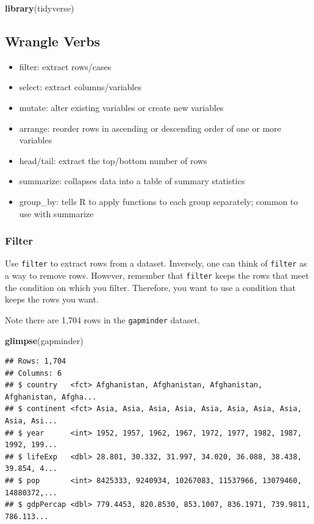 \documentclass[
]{book}
\newenvironment{Shaded}{\begin{snugshade}}{\end{snugshade}}
\newcommand{\KeywordTok}[1]{\textcolor[rgb]{0.13,0.29,0.53}{\textbf{#1}}}
\newcommand{\NormalTok}[1]{#1}
\providecommand{\tightlist}{%
  \setlength{\itemsep}{0pt}\setlength{\parskip}{0pt}}
\begin{document}
\begin{Shaded}
\begin{Highlighting}[]
\KeywordTok{library}\NormalTok{(tidyverse)}
\end{Highlighting}
\end{Shaded}

\hypertarget{wrangle-verbs}{%
\subsection{Wrangle Verbs}\label{wrangle-verbs}}

\begin{itemize}
\tightlist
\item
  filter: extract rows/cases
\item
  select: extract columns/variables
\item
  mutate: alter existing variables or create new variables
\item
  arrange: reorder rows in ascending or descending order of one or more variables
\item
  head/tail: extract the top/bottom number of rows
\item
  summarize: collapses data into a table of summary statistics
\item
  group\_by: tells R to apply functions to each group separately; common to use with summarize
\end{itemize}

\hypertarget{filter}{%
\subsubsection*{Filter}\label{filter}}

Use \texttt{filter} to extract rows from a dataset. Inversely, one can think of \texttt{filter} as a way to remove rows. However, remember that \texttt{filter} keeps the rows that meet the condition on which you filter. Therefore, you want to use a condition that keeps the rows you want.

Note there are 1,704 rows in the \texttt{gapminder} dataset.

\begin{Shaded}
\begin{Highlighting}[]
\KeywordTok{glimpse}\NormalTok{(gapminder)}
\end{Highlighting}
\end{Shaded}

\begin{verbatim}
## Rows: 1,704
## Columns: 6
## $ country   <fct> Afghanistan, Afghanistan, Afghanistan, Afghanistan, Afgha...
## $ continent <fct> Asia, Asia, Asia, Asia, Asia, Asia, Asia, Asia, Asia, Asi...
## $ year      <int> 1952, 1957, 1962, 1967, 1972, 1977, 1982, 1987, 1992, 199...
## $ lifeExp   <dbl> 28.801, 30.332, 31.997, 34.020, 36.088, 38.438, 39.854, 4...
## $ pop       <int> 8425333, 9240934, 10267083, 11537966, 13079460, 14880372,...
## $ gdpPercap <dbl> 779.4453, 820.8530, 853.1007, 836.1971, 739.9811, 786.113...
\end{verbatim}
\end{document}
